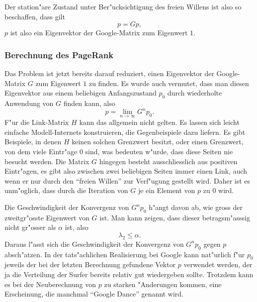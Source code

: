 Der station"are Zustand unter Ber"ucksichtigung des freien Willens ist also
so beschaffen, dass gilt
\[
p=Gp,
\]
$p$ ist also ein Eigenvektor der Google-Matrix zum Eigenwert $1$.

\subsubsection{Berechnung des PageRank}
Das Problem ist jetzt bereits darauf reduziert, einen Eigenvektor der
Google-Matrix $G$ zum Eigenwert $1$ zu finden.
Es wurde auch vermutet, dass man diesen Eigenvektor
aus einem beliebigen Anfangszustand $p_0$ durch wiederholte Anwendung von
$G$ finden kann, also
\[
p=\lim_{n\to\infty}G^np_0.
\]
F"ur die Link-Matrix $H$ kann das allgemein nicht gelten.
Es lassen sich leicht einfache Modell-Internets konstruieren,
die Gegenbeispiele dazu liefern.
Es gibt Beispiele, in denen
$H$ keinen solchen Grenzwert besitzt, oder einen Grenzwert, von dem
viele Eintr"age $0$ sind, was bedeuten w"urde, dass diese Seiten nie besucht
werden.
Die Matrix $G$ hingegen besteht ausschliesslich aus positiven Eintr"agen, es
gibt also zwischen zwei beliebigen Seiten immer einen Link, auch wenn er nur
durch den ``freien Willen'' zur Verf"ugung gestellt wird.
Daher ist es unm"oglich,
dass durch die Iteration von $G$ je ein Element von $p$ zu $0$ wird.

Die Geschwindigkeit der Konvergenz von $G^np_0$ h"angt davon ab, wie gross der
zweitgr"osste Eigenwert von $G$ ist.
Man kann zeigen, dass dieser betragsm"asssig
nicht gr"osser als $\alpha$ ist, also
\[
\lambda_2\le \alpha.
\]
Daraus l"asst sich die Geschwindigkeit der Konvergenz von $G^np_0$ gegen $p$
absch"atzen.
In der tats"achlichen Realisierung bei Google kann nat"urlich
f"ur $p_0$ jeweils der bei der letzten Berechnung gefundene Vektor $p$ verwendet
werden, der ja die Verteilung der Surfer bereits relativ gut wiedergeben sollte.
Trotzdem kann es bei der Neuberechnung von $p$ zu starken "Anderungen kommen,
eine Erscheinung, die manchmal ``Google Dance'' genannt wird.
